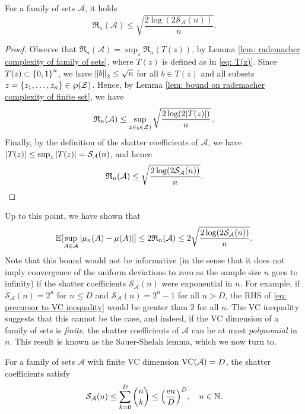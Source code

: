 \begin{proposition}
\label{prop: bound on rademacher complexity of family of sets}
For a family of sets $\mathcal{A}$, it holds
\[
    \mathfrak{R}_n(\mathcal{A}) \leq \sqrt{\frac{2 \log(2 \mathcal{S}_{\mathcal{A}}(n)) }{n}}.
\]
\end{proposition}

\begin{proof}
Observe that $\mathfrak{R}_n(\mathcal{A}) = \sup_z \mathfrak{R}_n(T(z))$, by Lemma \ref{lem: rademacher complexity of family of sets}, where $T(z)$ is defined as in \eqref{eq: T(z)}. Since $T(z) \subset \set{0, 1}^n$, we have $\norm{b}_2 \leq \sqrt{n}$ for all $b \in T(z)$ and all subsets $z = \set{z_1, \dots, z_n} \in \power(\mathcal{Z})$. Hence, by Lemma \ref{lem: bound on rademacher complexity of finite set}, we have
\[
    \mathfrak{R}_n(\mathcal{A}) \leq \sup_{z \in \operatorname{\wp}(\mathcal{Z})} \sqrt{\frac{2 \log(2 \abs{T(z)})}{n}} \, .
\]
Finally, by the definition of the shatter coefficients of $\mathcal{A}$, we have $\abs{T(z)} \leq \sup_z \abs{T(z)} = \mathcal{S}_{\mathcal{A}}(n)$, and hence
\[
    \mathfrak{R}_n(\mathcal{A}) \leq \sqrt{\frac{2 \log(2 \mathcal{S}_{\mathcal{A}}(n)) }{n}}. \qedhere
\]
\end{proof}

Up to this point, we have shown that
\begin{equation}
\label{eq: precursor to VC inequality}
    \operatorname{\mathbb{E}}[\sup_{A \in \mathcal{A}} \abs{\mu_n(A) - \mu(A)}] \leq 2 \mathfrak{R}_n(\mathcal{A}) \leq 2 \sqrt{\frac{2 \log(2 \mathcal{S}_{\mathcal{A}}(n))}{n}}.
\end{equation}
Note that this bound would not be informative (in the sense that it does not imply convergence of the uniform deviations to zero as the sample size $n$ goes to infinity) if the shatter coefficients $\mathcal{S}_{\mathcal{A}}(n)$ were exponential in $n$. For example, if $\mathcal{S}_{\mathcal{A}}(n) = 2^n$ for $n \leq D$ and $\mathcal{S}_{\mathcal{A}}(n) = 2^n - 1$ for all $n > D$, the RHS of \eqref{eq: precursor to VC inequality} would be greater than $2$ for all $n$. The VC inequality suggests that this cannot be the case, and indeed, if the VC dimension of a family of sets is \emph{finite}, the shatter coefficients of $\mathcal{A}$ can be at most \emph{polynomial} in $n$. This result is known as the Sauer-Shelah lemma, which we now turn to.

\begin{lemma}
For a family of sets $\mathcal{A}$ with finite VC dimension $\operatorname{VC}(\mathcal{A}) = D$, the shatter coefficients satisfy
\[
    \mathcal{S}_{\mathcal{A}}(n) \leq \sum_{k=0}^D \binom{n}{k} \leq \left(\frac{\e n}{D}\right)^D, \quad n \in \N.
\]
\end{lemma}

